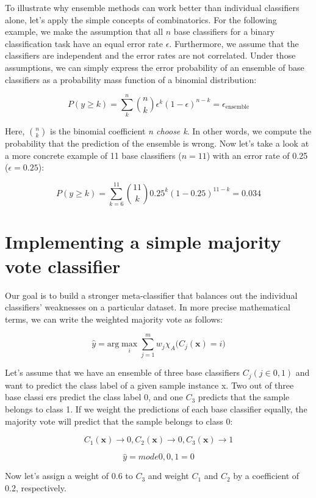 \documentclass[letterpaper]{report}
\begin{document}
To illustrate why ensemble methods can work better than individual classifiers alone, let's apply the simple concepts of combinatorics. For the following example, we make the assumption that all $n$ base classifiers for a binary classification task have an equal error rate $\epsilon$. Furthermore, we assume that the classifiers are independent and the error rates are not correlated. Under those assumptions, we can simply express the error probability of an ensemble of base classifiers as a probability
mass function of a binomial distribution:

\[
P(y \ge k) = \sum_{k}^{n} \binom{n}{k} \epsilon^k (1 - \epsilon)^{n-k} = \epsilon_{\text{ensemble}}
\]

Here, $\binom{n}{k}$ is the binomial coefficient \textit{n choose k}. In other words, we compute the probability that the prediction of the ensemble is wrong. Now let's take a look at a more concrete example of 11 base classifiers ($n=11$) with an error rate of 0.25 ($\epsilon = 0.25$):

\[
P(y \ge k) = \sum_{k=6}^{11} \binom{11}{k} 0.25^k (1 - 0.25)^{11-k} = 0.034
\]

\section{Implementing a simple majority vote classifier}

Our goal is to build a stronger meta-classifier that balances out the individual classifiers' weaknesses on a particular dataset.  In more precise mathematical terms, we can write the weighted majority vote as follows:
 
\[
\hat{y} = \text{arg} \max_i \sum_{j=1}^{m} w_j \chi_A \big(C_j (\mathbf{x})=i\big)
\] 

Let's assume that we have an ensemble of three base classifiers $C_j ( j \in {0,1})$ and want to predict the class label of a given sample instance x. Two out of three base classi ers predict the class label 0, and one $C_3$ predicts that the sample belongs to class 1. If we weight the predictions of each base classifier equally, the majority vote will predict that the sample belongs to class 0:

\[
C_1(\mathbf{x}) \rightarrow 0, C_2 (\mathbf{x}) \rightarrow 0, C_3(\mathbf{x}) \rightarrow 1
\]

\[
\hat{y} = mode{0, 0, 1} = 0 
\]

Now let's assign a weight of 0.6 to $C_3$ and weight $C_1$ and $C_2$ by a coefficient of 0.2, respectively.
\end{document}
